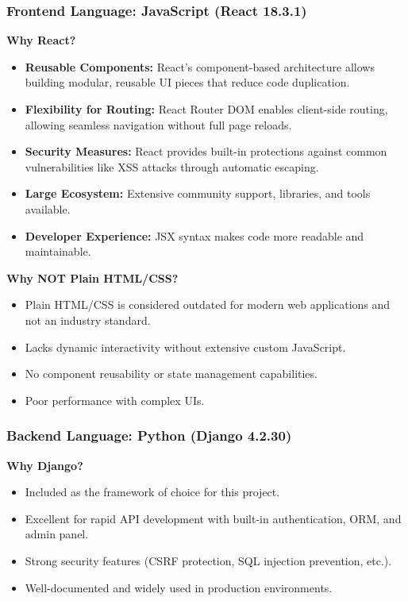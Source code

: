 \subsubsection{Frontend Language: JavaScript (React 18.3.1)}

\textbf{Why React?}

\begin{itemize}
  \item \textbf{Reusable Components:} React's component-based architecture allows building modular, reusable UI pieces that reduce code duplication.
  \item \textbf{Flexibility for Routing:} React Router DOM enables client-side routing, allowing seamless navigation without full page reloads.
  \item \textbf{Security Measures:} React provides built-in protections against common vulnerabilities like XSS attacks through automatic escaping.
  \item \textbf{Large Ecosystem:} Extensive community support, libraries, and tools available.
  \item \textbf{Developer Experience:} JSX syntax makes code more readable and maintainable.
\end{itemize}

\textbf{Why NOT Plain HTML/CSS?}

\begin{itemize}
  \item Plain HTML/CSS is considered outdated for modern web applications and not an industry standard.
  \item Lacks dynamic interactivity without extensive custom JavaScript.
  \item No component reusability or state management capabilities.
  \item Poor performance with complex UIs.
\end{itemize}
\subsubsection{Backend Language: Python (Django 4.2.30)}

\textbf{Why Django?}

\begin{itemize}
  \item Included as the framework of choice for this project.
  \item Excellent for rapid API development with built-in authentication, ORM, and admin panel.
  \item Strong security features (CSRF protection, SQL injection prevention, etc.).
  \item Well-documented and widely used in production environments.
\end{itemize}
